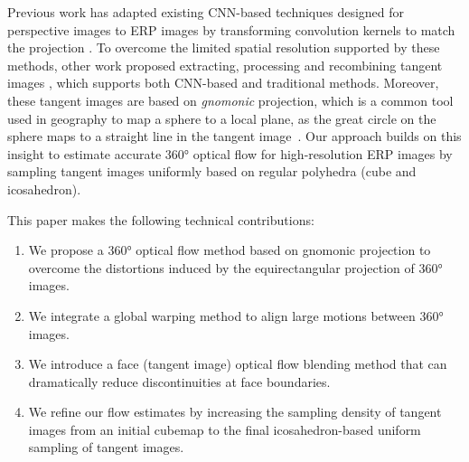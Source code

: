 %
Previous work has adapted existing CNN-based techniques designed for perspective images to ERP images by transforming convolution kernels to match the projection \cite{CoorsCG2018, SuG2019, TatenNT2018}.
%
To overcome the limited spatial resolution supported by these methods, other work proposed extracting, processing and recombining tangent images \cite{EderSLF2020, LuoZSX2019, ZhangLSC2019, LeeJYJY2019, WangHCLYSCS2018, WangYSCT2020}, which supports both CNN-based and traditional methods.
%
%
Moreover, these tangent images are based on \emph{gnomonic} projection, which is a common tool used in geography to map a sphere to a local plane, as the great circle on the sphere maps to a straight line in the tangent image~\cite{EderSLF2020}.
%
Our approach builds on this insight to estimate accurate 360° optical flow for high-resolution ERP images by sampling tangent images uniformly based on regular polyhedra (cube and icosahedron).


This paper makes the following technical contributions:
%
\begin{enumerate}[nosep]
\item 
We propose a 360° optical flow method based on gnomonic projection to overcome the distortions induced by the  equirectangular projection of 360° images.

\item
We integrate a global warping method to align large motions between 360° images.

\item
We introduce a face (tangent image) optical flow blending method that can dramatically reduce discontinuities at face boundaries.

\item 
We refine our flow estimates by increasing the sampling density of tangent images from an initial cubemap to the final icosahedron-based uniform sampling of tangent images.
\end{enumerate}
